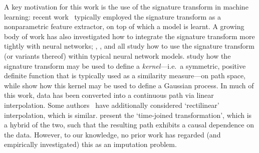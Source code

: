 \documentclass{article}
\begin{document}
A key motivation for this work is the use of the signature transform in
machine learning: recent work~\citep{primer2016,
kormilitzlin2016, yang2016rotation, li2017lpsnet, yang2017leveraging,
PerezArribas2018, morrill2019sepsis} typically employed the signature transform as a nonparametric feature extractor, on top of which
a model is learnt. A growing body of work has also investigated how to
integrate the signature transform more tightly with neural networks; 
\citet{jeremythesis}, \citet{logsigrnn}, and \citet{kidger2019deep} all
study how to use the signature transform (or variants thereof) within typical neural network models.
\citet{chevyrev2018signature, kiraly2019kernels} study how the signature
transform may be used to define a \emph{kernel}---i.e.\ a symmetric,
positive definite function that is typically used as a similarity
measure---on path space, while \citet{toth2019gp} show how this kernel
may be used to define a Gaussian process.
%
In much of this work, data has been converted into a continuous path via
linear interpolation. Some authors~\citep{primer2016,
fermanian2019embedding} have additionally considered `rectilinear'
interpolation, which is similar. \citet{levin2013} present the
`time-joined transformation', which is a hybrid of the two, such that
the resulting path exhibits a causal dependence on the data.  However,
to our knowledge, no prior work has regarded (and empirically investigated) this as an imputation
problem.
\end{document}
